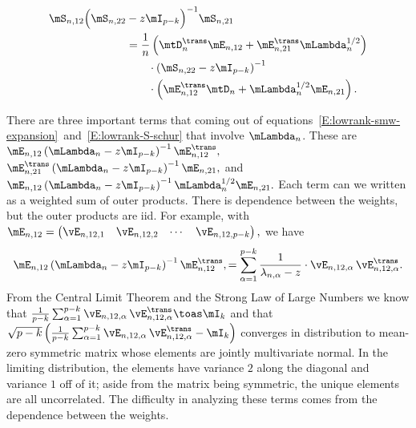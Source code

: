 \begin{align}\label{E:lowrank-S-schur}
    \begin{split}
    \mS_{n,12} 
    \Big(
        \mS_{n,22} &- z \mI_{p-k}
    \Big)^{-1}
    \mS_{n,21} \\
        &=
            \frac{1}{n}
            \left(
                \mtD_n^\trans \mE_{n,12}
                +
                \mE_{n,21}^\trans \mLambda_n^{1/2}
            \right) \\
            &\qquad\cdot
            \left(
                \mS_{n,22} - z \mI_{p-k}
            \right)^{-1} \\
            &\qquad\cdot
            \left(
                \mE_{n,12}^\trans \mtD_n
                +
                \mLambda_n^{1/2} \mE_{n,21}
            \right).
    \end{split}
\end{align}

There are three important terms that coming out of equations~\eqref{E:lowrank-smw-expansion}~and~\eqref{E:lowrank-S-schur} that involve $\mLambda_n$.  These are
\(
    \mE_{n,12}
    \left(
        \mLambda_n - z \mI_{p-k}
    \right)^{-1}
    \mE_{n,12}^\trans,
\)
\(
    \mE_{n,21}^\trans
    \left(
        \mLambda_n - z \mI_{p-k}
    \right)^{-1}
    \mE_{n,21},
\)
and
\(
    \mE_{n,12}
    \left(
        \mLambda_n - z \mI_{p-k}
    \right)^{-1}
    \mLambda_n^{1/2}
    \mE_{n,21}.
\)
Each term can we written as a weighted sum of outer products.  There is
dependence between the weights, but the outer products are iid.  For example,
with
\(
    \mE_{n,12}
    =
    \left(
    \begin{matrix}
        \vE_{n,12,1} &
        \vE_{n,12,2} &
        \cdots &
        \vE_{n,12,p-k}
    \end{matrix}
    \right),
\) 
we have
\[
    \mE_{n,12}
    \left(
        \mLambda_n - z \mI_{p-k}
    \right)^{-1}
    \mE_{n,12}^\trans,
        =
            \sum_{\alpha=1}^{p-k}
                \frac{1}{\lambda_{n,\alpha} - z}
                \cdot
                \vE_{n,12,\alpha} \,
                \vE_{n,12,\alpha}^\trans.
\]
From the Central Limit Theorem and the Strong Law of Large Numbers
we know that
\(
    \frac{1}{p-k}
    \sum_{\alpha=1}^{p-k}
        \vE_{n,12,\alpha} \,
        \vE_{n,12,\alpha}^\trans
        \toas
            \mI_{k}
\)
and that
\(
    \sqrt{p-k}
    \left(
        \frac{1}{p-k}
        \sum_{\alpha=1}^{p-k}
            \vE_{n,12,\alpha} \,
            \vE_{n,12,\alpha}^\trans
        -
        \mI_{k}
    \right)
\)
converges in distribution to mean-zero symmetric matrix whose elements are jointly multivariate normal.  In the limiting distribution, the elements have variance $2$ along the diagonal and variance $1$ off of it; aside from the matrix being symmetric, the unique elements are all uncorrelated.  The
difficulty in analyzing these terms comes from the dependence between 
the weights.

